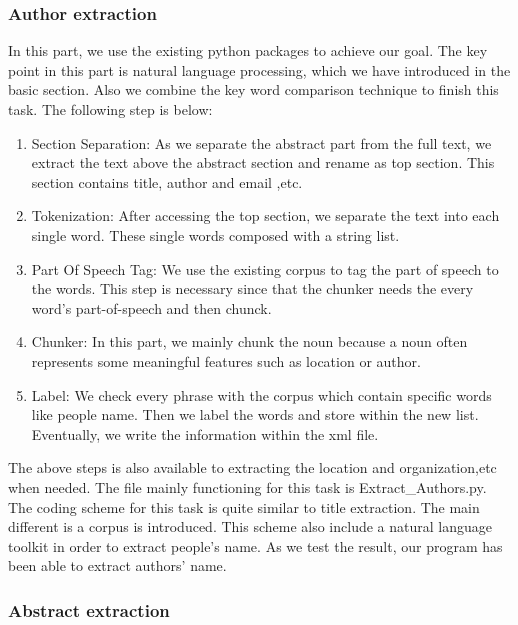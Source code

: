 \subsubsection{Author extraction}

In this part, we use the existing python packages to achieve our goal.
The key point in this part is natural language processing, 
which we have introduced in the basic section.
Also we combine the key word comparison technique to finish this task.
The following step is below:

\begin{enumerate}
	
	\item Section Separation: As we separate the abstract part from the full text, we extract the text above the 
	abstract section and rename as top section. 
	This section contains title, author and email ,etc.
	\item Tokenization: After accessing the top section, we separate the text into each single word. 
	These single words composed with a string list. 
	\item Part Of Speech Tag: We use the existing corpus to tag the part of speech to the words. 
	This step is necessary since that the chunker needs the every word's part-of-speech and then chunck.
	\item Chunker: In this part, we mainly chunk the noun because a noun often represents some meaningful features 
	such as location or author.
	\item Label: We check every phrase with the corpus which contain specific words like people name. 
	Then we label the words and store within the new list. 
	Eventually, we write the information within the xml file. 
	
\end{enumerate}

The above steps is also available to extracting the location and organization,etc 
when needed. 
The file mainly functioning for this task is Extract\_Authors.py.
The coding scheme for this task is quite similar to title extraction.
The main different is a corpus is introduced.
This scheme also include a natural language toolkit in order to extract people's name. 
As we test the result, our program has been able to extract authors' name.

\subsubsection{Abstract extraction}

